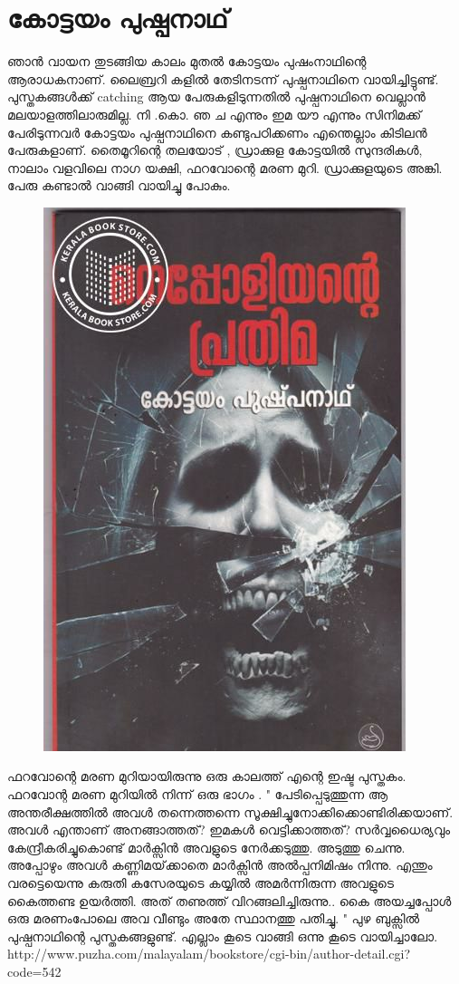 \documentclass[10pt,a4paper]{report}
\begin{document}
    \section{കോട്ടയം പുഷ്പനാഥ്  }
    ഞാൻ വായന തുടങ്ങിയ കാലം മുതൽ കോട്ടയം പുഷംനാഥിന്റെ ആരാധകനാണ്. ലൈബ്രറി കളിൽ തേടിനടന്ന് പുഷ്പനാഥിനെ വായിച്ചിട്ടുണ്ട്. പുസ്തകങ്ങൾക്ക് catching ആയ പേരുകളിടുന്നതിൽ പുഷ്പനാഥിനെ വെല്ലാൻ മലയാളത്തിലാരുമില്ല. നി .കൊ. ഞ ച എന്നും ഇമ യൗ എന്നും സിനിമക്ക് പേരിടുന്നവർ കോട്ടയം പുഷ്പനാഥിനെ കണ്ടുപഠിക്കണം എന്തെല്ലാം കിടിലൻ പേരുകളാണ്. തൈമൂറിന്റെ തലയോട് , ഡ്രാക്കുള കോട്ടയിൽ സുന്ദരികൾ, നാലാം വളവിലെ നാഗ യക്ഷി, ഫറവോന്റെ മരണ മുറി. ഡ്രാക്കുളയുടെ അങ്കി. പേരു കണ്ടാൽ വാങ്ങി വായിച്ചു പോകും. 
    
 
\begin{figure}[H]
  \center
\includegraphics[scale=.25]{images/push}
\label{push}
\caption{   }
\end{figure}    
    
    ഫറവോന്റെ മരണ മുറിയായിരുന്നു ഒരു കാലത്ത് എന്റെ ഇഷ്ട പുസ്തകം. ഫറവോന്റ മരണ മുറിയിൽ നിന്ന് ഒരു ഭാഗം . " പേടിപ്പെടുത്തുന്ന ആ അന്തരീക്ഷത്തില്‍ അവള്‍ തന്നെത്തന്നെ സൂക്ഷിച്ചുനോക്കിക്കൊണ്ടിരിക്കയാണ്‌. അവള്‍ എന്താണ്‌ അനങ്ങാത്തത്‌? ഇമകള്‍ വെട്ടിക്കാത്തത്‌? സര്‍വ്വധൈര്യവും കേന്ദ്രീകരിച്ചുകൊണ്ട്‌ മാര്‍ക്സിന്‍ അവളുടെ നേര്‍ക്കടുത്തു. അടുത്തു ചെന്നു. അപ്പോഴും അവള്‍ കണ്ണിമയ്‌ക്കാതെ മാര്‍ക്സിന്‍ അല്‍പ്പനിമിഷം നിന്നു. എന്തും വരട്ടെയെന്നു കരുതി കസേരയുടെ കയ്യില്‍ അമര്‍ന്നിരുന്ന അവളുടെ കൈത്തണ്ട ഉയര്‍ത്തി. അത്‌ തണുത്ത്‌ വിറങ്ങലിച്ചിരുന്നു.. കൈ അയച്ചപ്പോള്‍ ഒരു മരണംപോലെ അവ വീണ്ടും അതേ സ്ഥാനത്തു പതിച്ചു. " പുഴ ബുക്സിൽ പുഷ്പനാഥിന്റെ പുസ്തകങ്ങളുണ്ട്. എല്ലാം കൂടെ വാങ്ങി ഒന്നു കൂടെ വായിച്ചാലോ. http://www.puzha.com/malayalam/bookstore/cgi-bin/author-detail.cgi?code=542 
    
\end{document}
